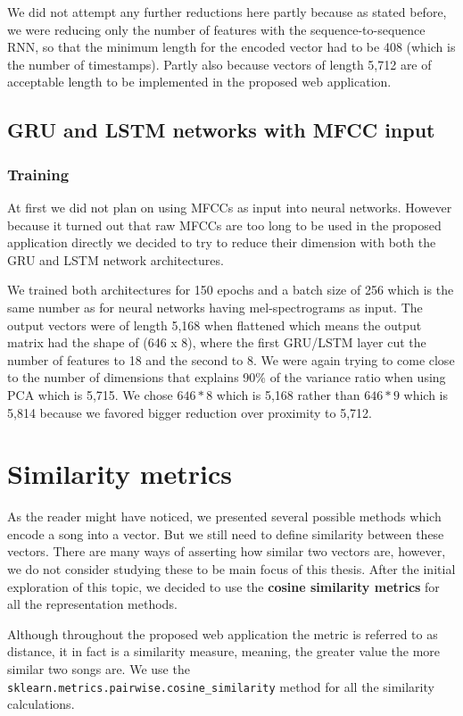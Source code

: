 We did not attempt any further reductions here partly because as stated before, we were reducing only the number of features with the sequence-to-sequence RNN, so that the minimum length for the encoded vector had to be 408 (which is the number of timestamps). Partly also because vectors of length 5,712 are of acceptable length to be implemented in the proposed web application. 


\subsection{GRU and LSTM networks with MFCC input}\label{ssec:GRU_LSTM_MFCC_experiments}

\subsubsection{Training}
At first we did not plan on using MFCCs as input into neural networks. However because it turned out that raw MFCCs are too long to be used in the proposed application directly we decided to try to reduce their dimension with both the GRU and LSTM network architectures. 

We trained both architectures for 150 epochs and a batch size of 256 which is the same number as for neural networks having mel-spectrograms as input. The output vectors were of length 5,168 when flattened which means the output matrix had the shape of (646 x 8), where the first GRU/LSTM layer cut the number of features to 18 and the second to 8. We were again trying to come close to the number of dimensions that explains 90\% of the variance ratio when using PCA which is 5,715. We chose $646*8$ which is 5,168 rather than $646*9$ which is 5,814 because we favored bigger reduction over proximity to 5,712.

\section{Similarity metrics}\label{sec:similarity_metrics}
As the reader might have noticed, we presented several possible methods which encode a song into a vector. But we still need to define similarity between these vectors. There are many ways of asserting how similar two vectors are, however, we do not consider studying these to be main focus of this thesis. After the initial exploration of this topic, we decided to use the \textbf{cosine similarity metrics} for all the representation methods. 

Although throughout the proposed web application the metric is referred to as distance, it in fact is a similarity measure, meaning, the greater value the more similar two songs are. We use the \texttt{sklearn.metrics.pairwise.cosine\_similarity} method for all the similarity calculations.

